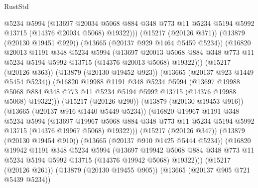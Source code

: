\begin{lexlean}{RustStd}
\begin{coremodule}
                  @5234
                  @5994
                  (@13697
                    @20034
                    @5068
                    @884
                    @348
                    @773
                    @11
                    @5234
                    @5194
                    @5992
                    @13715
                    (@14376 @20034 @5068)
                    @19322)))
              (@15217 (@20126 @371))
              (@13879 (@20130 @19451 @929))
              (@13665 (@20137 @929 @1464 @5459 @5234))
              (@16820
                @20013
                @1191
                @348
                @5234
                @5994
                (@13697
                  @20013
                  @5068
                  @884
                  @348
                  @773
                  @11
                  @5234
                  @5194
                  @5992
                  @13715
                  (@14376 @20013 @5068)
                  @19322)))
            (@15217 (@20126 @363))
            (@13879 (@20130 @19452 @923))
            (@13665 (@20137 @923 @1449 @5454 @5234))
            (@16820
              @19988
              @1191
              @348
              @5234
              @5994
              (@13697
                @19988
                @5068
                @884
                @348
                @773
                @11
                @5234
                @5194
                @5992
                @13715
                (@14376 @19988 @5068)
                @19322)))
          (@15217 (@20126 @290))
          (@13879 (@20130 @19453 @916))
          (@13665 (@20137 @916 @1440 @5449 @5234))
          (@16820
            @19967
            @1191
            @348
            @5234
            @5994
            (@13697
              @19967
              @5068
              @884
              @348
              @773
              @11
              @5234
              @5194
              @5992
              @13715
              (@14376 @19967 @5068)
              @19322)))
        (@15217 (@20126 @347))
        (@13879 (@20130 @19454 @910))
        (@13665 (@20137 @910 @1425 @5444 @5234))
        (@16820
          @19942
          @1191
          @348
          @5234
          @5994
          (@13697
            @19942
            @5068
            @884
            @348
            @773
            @11
            @5234
            @5194
            @5992
            @13715
            (@14376 @19942 @5068)
            @19322)))
      (@15217 (@20126 @261))
      (@13879 (@20130 @19455 @905))
      (@13665 (@20137 @905 @721 @5439 @5234))

\end{coremodule}
\end{lexlean}
